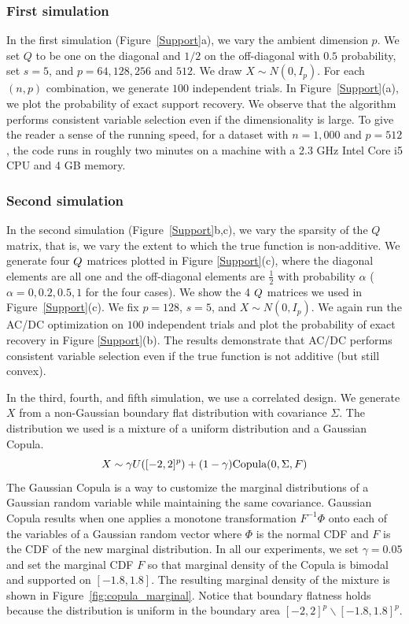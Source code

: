 \subsubsection{First simulation}
In the \textrm{first simulation} (Figure~\ref{Support}a), we vary the
ambient dimension $p$. We set $Q$ to be one on the diagonal and $1/2$ on
the off-diagonal with $0.5$ probability, set $s=5$, and $p=64,128,256$
and $512$. We draw $X \sim N(0, I_p)$.  For each $(n,p)$ combination,
we generate $100$ independent trials.  In Figure~\ref{Support}(a), we
plot the probability of exact support recovery. We observe that the
algorithm performs consistent variable selection even if the
dimensionality is large. To give the reader a sense of the running
speed, for a dataset with $n=1,000$ and $p=512$, the code runs in
roughly two minutes on a machine with a 2.3 GHz Intel Core i5 CPU and 4
GB memory.


\subsubsection{Second simulation}
In the \textrm{second simulation} (Figure~\ref{Support}b,c), we vary the sparsity of the $Q$ matrix, that is, we vary the extent to which the true function is non-additive. We generate four $Q$ matrices
plotted in Figure \ref{Support}(c), where the diagonal elements are all one and
the off-diagonal elements are $\frac{1}{2}$ with probability $\alpha$
($\alpha=0,0.2,0.5,1$ for the four cases). We show the 4 $Q$ matrices we used in Figure~\ref{Support}(c).
We fix $p=128$, $s=5$, and $X \sim N(0,I_p)$.  We again run the AC/DC optimization on $100$
independent trials and plot the probability of exact recovery
in Figure \ref{Support}(b). The results demonstrate that AC/DC performs
consistent variable selection even if the true function is not additive (but
still convex). 

In the third, fourth, and fifth simulation, we use a correlated design. We generate $X$ from a non-Gaussian boundary flat distribution with covariance $\Sigma$. The distribution we used is a mixture of a uniform distribution and a Gaussian Copula.
\[
X \sim \gamma U([-2, 2]^p) + (1-\gamma) \textrm{Copula}(0, \Sigma, F)
\]
The Gaussian Copula is a way to customize the marginal distributions of a Gaussian random variable while maintaining the same covariance. Gaussian Copula results when one applies a monotone transformation $F^{-1} \Phi$ onto each of the variables of a Gaussian random vector where $\Phi$ is the normal CDF and $F$ is the CDF of the new marginal distribution. In all our experiments, we set $\gamma = 0.05$ and set the marginal CDF $F$ so that marginal density of the Copula is bimodal and supported on $[-1.8, 1.8]$. The resulting marginal density of the mixture is shown in Figure~\ref{fig:copula_marginal}. Notice that boundary flatness holds because the distribution is uniform in the boundary area $[-2,2]^p \backslash [-1.8, 1.8]^p$.

